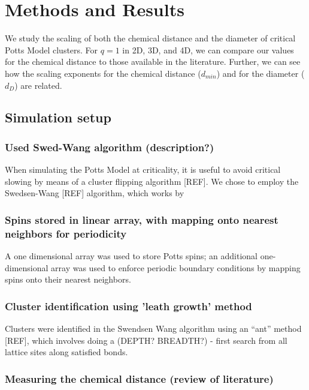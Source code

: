 \documentclass{article}
\begin{document}
\section{Methods and Results}
\label{sec-2}

We study the scaling of both the chemical distance and the diameter of critical Potts Model clusters.  For $q=1$ in 2D, 3D, and 4D, we can compare our values for the chemical distance to those available in the literature.  Further, we can see how the scaling exponents for the chemical distance ($d_{min}$) and for the diameter ($d_{D}$) are related. 
\subsection{Simulation setup}
\label{sec-2.1}
\subsubsection{Used Swed-Wang algorithm (description?)}
\label{sec-2.1.1}

When simulating the Potts Model at criticality, it is useful to avoid critical slowing by means of a cluster flipping algorithm [REF]. We chose to employ the Swedsen-Wang [REF] algorithm, which works by 
\subsubsection{Spins stored in linear array, with mapping onto nearest neighbors for periodicity}
\label{sec-2.1.2}

A one dimensional array was used to store Potts spins; an additional one-dimensional array was used to enforce periodic boundary conditions by mapping spins onto their nearest neighbors.  
\subsubsection{Cluster identification using 'leath growth' method}
\label{sec-2.1.3}

Clusters were identified in the Swendsen Wang algorithm using an ``ant'' method [REF], which involves doing a (DEPTH? BREADTH?) - first search from all lattice sites along satisfied bonds.
\subsubsection{Measuring the chemical distance (review of literature)}
\label{sec-2.1.4}
\end{document}
